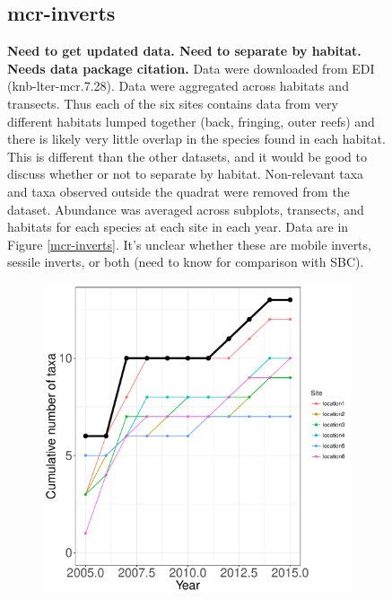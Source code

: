 \documentclass[11pt, oneside]{article}
\begin{document}
\begin{figure}[h!]
\subsection {mcr-inverts}
{\bf Need to get updated data. Need to separate by habitat. Needs data package citation.}
Data were downloaded from EDI (knb-lter-mcr.7.28).
Data were aggregated across habitats and transects.
Thus each of the six sites contains data from very different habitats lumped together (back, fringing, outer reefs) and there is likely very little overlap in the species found in each habitat. 
This is different than the other datasets, and it would be good to discuss whether or not to separate by habitat.
Non-relevant taxa and taxa observed outside the quadrat were removed from the dataset.
Abundance was averaged across subplots, transects, and habitats for each species at each site in each year.
Data are in Figure \ref{mcr-inverts}.
It's unclear whether these are mobile inverts, sessile inverts, or both (need to know for comparison with SBC).
\begin{figure}[h!]
\centering
\includegraphics[scale = 0.4]{mcr-inverts-castorani_species_accumulation_curve.pdf}

\end{figure}
\end{figure}
\end{document}
